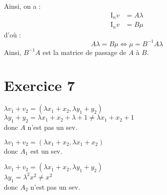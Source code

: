 \documentclass[a4paper, titlepage]{article}
\begin{document}
	Ainsi, on a :
	\begin{align*}
		\mathrm{I}_n v &= A\lambda \\
		\mathrm{I}_n v &= B\mu
	\end{align*}
	d'où :
	$$ A\lambda = B\mu \iff \mu = B^{-1}A\lambda $$
	Ainsi, $B^{-1}A$ est la matrice de passage de $A$ à $B$.
	\section*{Exercice 7}
	$\lambda v_1+v_2 = (\lambda x_1+x_2,\lambda y_1 + y_2)$\\
	$\lambda y_1+y_2=\lambda x_1+x_2+\lambda+1 \neq \lambda x_1+x_2+1$\\
	donc $A$ n'est pas un sev.

	$\lambda v_1+v_2 = (\lambda x_1 + x_2, \lambda x_1 + x_2)$\\
	donc $A_1$ est un sev.

	$\lambda v_1+v_2 = (\lambda x_1+x_2,\lambda y_1 + y_2)$\\
	$\lambda y_1 = \lambda^2 x^2 \neq x^2$\\
	donc $A_2$ n'est pas un sev.
\end{document}
